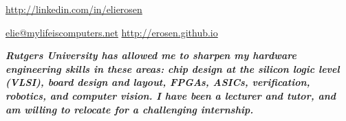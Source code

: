 \documentclass[10pt,a4paper]{article}
\begin{document}
\sloppy %

\centerline{\noindent\href{http://www.linkedin.com/in/elierosen}{http://linkedin.com/in/elierosen}}

\nobreakvspace{0.3em} %

\noindent\href{mailto:elie@mylifeiscomputers.net}{elie\mbox{}@\mbox{}mylifeiscomputers.net} \hfill \href{http://erosen.github.io}{http://erosen.github.io} \\

\spacedhrule{-0.6em}{-0.4em} %

\headedsection
{\textbf{\emph{\small{Rutgers University has allowed me to sharpen my hardware engineering skills in these areas: chip design at the silicon logic level (VLSI), board design and layout, FPGAs, ASICs, verification, robotics, and computer vision. I have been a lecturer and tutor, and am willing to relocate for a challenging internship.} }}}


\spacedhrule{0.6em}{-0.4em}


	
		{}
	
		{}

		{}
\end{document}
